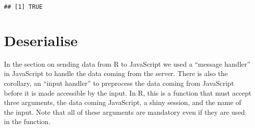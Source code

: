 \documentclass[
]{krantz}
\makeatletter
\newenvironment{Shaded}{\begin{snugshade}}{\end{snugshade}}
\newcommand{\CommentTok}[1]{\textcolor[rgb]{0.37,0.37,0.37}{\textit{#1}}}
\newcommand{\ControlFlowTok}[1]{\textcolor[rgb]{0.27,0.27,0.27}{\textbf{#1}}}
\newcommand{\DataTypeTok}[1]{\textcolor[rgb]{0.27,0.27,0.27}{#1}}
\newcommand{\KeywordTok}[1]{\textcolor[rgb]{0.27,0.27,0.27}{\textbf{#1}}}
\newcommand{\NormalTok}[1]{#1}
\newcommand{\OperatorTok}[1]{\textcolor[rgb]{0.43,0.43,0.43}{\textbf{#1}}}
\newcommand{\StringTok}[1]{\textcolor[rgb]{0.5,0.5,0.5}{#1}}
\newenvironment{kframe}{%
\medskip{}
\setlength{\fboxsep}{.8em}
 \def\at@end@of@kframe{}%
 \ifinner\ifhmode%
  \def\at@end@of@kframe{\end{minipage}}%
  \begin{minipage}{\columnwidth}%
 \fi\fi%
 \def\FrameCommand##1{\hskip\@totalleftmargin \hskip-\fboxsep
 \colorbox{shadecolor}{##1}\hskip-\fboxsep
     \hskip-\linewidth \hskip-\@totalleftmargin \hskip\columnwidth}%
 \MakeFramed {\advance\hsize-\width
   \@totalleftmargin\z@ \linewidth\hsize
   \@setminipage}}%
 {\par\unskip\endMakeFramed%
 \at@end@of@kframe}
\renewenvironment{Shaded}{\begin{kframe}}{\end{kframe}}
\makeatother
\begin{document}
\begin{Shaded}
\end{Shaded}

\begin{verbatim}
## [1] TRUE
\end{verbatim}

\hypertarget{deserialise}{%
\section*{Deserialise}\label{deserialise}}


In the section on sending data from R to JavaScript we used a ``message handler'' in JavaScript to handle the data coming from the server. There is also the corollary, an ``input handler'' to preprocess the data coming from JavaScript before it is made accessible by the input. In R, this is a function that must accept three arguments, the data coming JavaScript, a shiny session, and the name of the input. Note that all of these arguments are mandatory even if they are used in the function.
\end{document}
